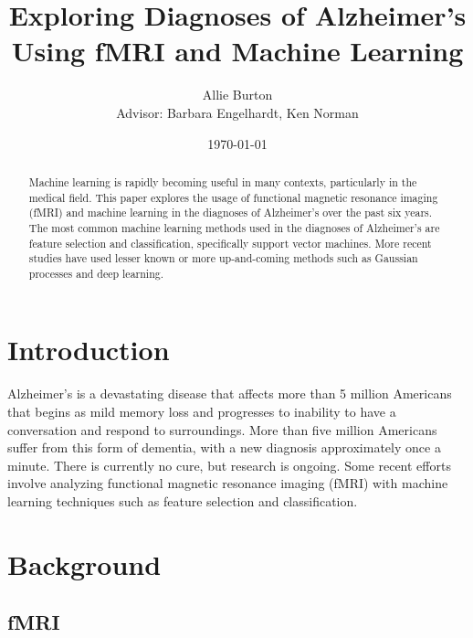 \documentclass[pageno]{jpaper}
\begin{document}
\title{\myfont{} Exploring Diagnoses of Alzheimer's\\ Using fMRI and Machine Learning}

\author{Allie Burton\\Advisor: Barbara Engelhardt, Ken Norman}

\date{\today}


\maketitle

\thispagestyle{empty}
\doublespacing{}
\begin{abstract}
    Machine learning is rapidly becoming useful in many contexts, particularly
    in the medical field. This paper explores the usage of functional
    magnetic resonance imaging (fMRI) and machine learning in the diagnoses of
    Alzheimer's over the past six years. The most common machine learning methods
    used in the diagnoses of Alzheimer's are feature selection and classification,
    specifically support vector machines. More recent studies have used lesser known
    or more up-and-coming methods such as Gaussian processes and deep learning.
\end{abstract}

\section{Introduction}

Alzheimer's is a devastating disease that affects more than 5 million Americans
that begins as mild memory loss and progresses to inability to have a
conversation and respond to surroundings.
More than five million Americans suffer from this form of dementia, with a new
diagnosis approximately once a minute. There is currently no cure, but research
is ongoing\cite{AlzheimersAssociation2016,AlzheimersAssociation}. Some recent
efforts involve analyzing functional magnetic resonance imaging (fMRI) with
machine learning techniques such as feature selection and classification.

\section{Background}

\subsection{fMRI}
\end{document}
